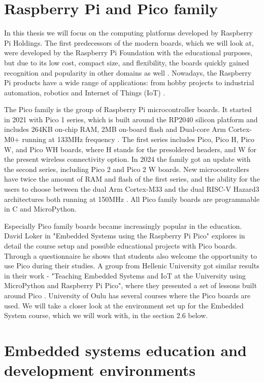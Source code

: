 \section{Raspberry Pi and Pico family}

In this thesis we will focus on the computing platforms developed by Raspberry Pi Holdings. The first predecessors of the modern boards, which we will look at, were developed by the Raspberry Pi Foundation with the educational purposes, but due to its low cost, compact size, and flexibility, the boards quickly gained recognition and popularity in other domains as well \cite{raspberry_history}. Nowadays, the Raspberry Pi products have a wide range of applications: from hobby projects to industrial automation, robotics and Internet of Things (IoT) \cite{raspberry_success}. 

The Pico family is the group of Raspberry Pi microcontroller boards. It started in 2021 with Pico 1 series, which is built around the RP2040 silicon platform and includes 264KB on-chip RAM, 2MB on-board flash and Dual-core Arm Cortex-M0+ running at 133MHz frequency \cite{raspberry_pico_1}. The first series includes Pico, Pico H, Pico W, and Pico WH boards, where H stands for the presoldered headers, and W for the present wireless connectivity option. In 2024 the family got an update with the second series, including Pico 2 and Pico 2 W boards. New microcontrollers have twice the amount of RAM and flash of the first series, and the ability for the users to choose between the dual Arm Cortex-M33 and the dual RISC-V Hazard3 architectures both running at 150MHz \cite{raspberry_pico_2}. All Pico family boards are programmable in C and MicroPython.

Especially Pico family boards became increasingly popular in the education. David Loker in "Embedded Systems using the Raspberry Pi Pico" \cite{loker} explores in detail the course setup and possible educational projects with Pico boards. Through a questionnaire he shows that students also welcome the opportunity to use Pico during their studies. A group from Hellenic University got similar results in their work - "Teaching Embedded Systems and IoT at the University using MicroPython and Raspberry Pi Pico", where they presented a set of lessons built around Pico \cite{doropoulou}. University of Oulu has several courses where the Pico boards are used. We will take a closer look at the environment set up for the Embedded System course, which we will work with, in the section 2.6 below.

\section{Embedded systems education and development environments}

